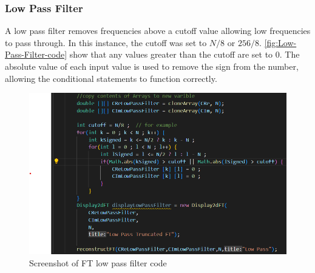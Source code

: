     \subsubsection{Low Pass Filter}
    A low pass filter removes frequencies above a cutoff value allowing low frequencies to pass through. In this instance, the cutoff was set to $N/8$ or $256/8$. \autoref{fig:Low-Pass-Filter-code} show that any values greater than the cutoff are set to $0$. The absolute value of each input value is used to remove the sign from the number, allowing the conditional statements to function correctly. 
    
    \begin{figure}[H]
        \centering
        \includegraphics[width=0.8\columnwidth]{Figures/Week 1/W1-Low-Pass-Code.png}
        \caption{Screenshot of FT low pass filter code}
        \label{fig:Low-Pass-Filter-code}
      \end{figure}

